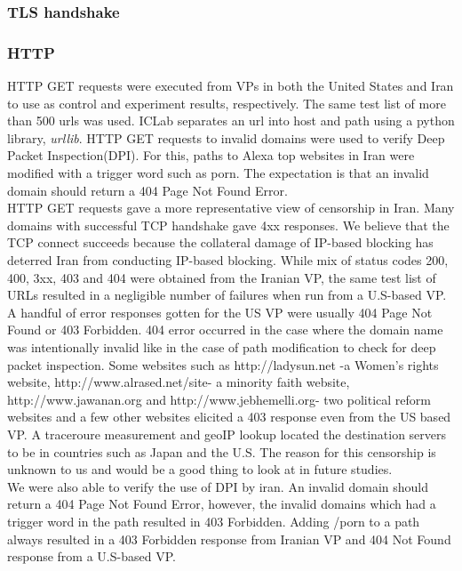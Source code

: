 \subsubsection{TLS handshake}
\subsubsection{HTTP}
 HTTP GET requests were executed from VPs  in both the United States and Iran to use as control and experiment results, respectively. The same test list of more than 500 urls was used. ICLab separates an url into host and path using a python library, \textit{urllib}. HTTP GET requests to invalid domains were used to verify Deep Packet Inspection(DPI). For this, paths to Alexa top websites in Iran were modified with a trigger word such as porn. The expectation is that an invalid domain should return a 404 Page Not Found Error.\\
HTTP GET requests gave a more representative view of censorship in Iran. Many domains with successful TCP handshake gave 4xx responses. We believe that  the TCP connect succeeds because the collateral damage of IP-based blocking has deterred Iran from conducting IP-based blocking. While mix of status codes 200, 400, 3xx, 403 and 404 were obtained from the Iranian VP, the same test list of URLs resulted in a negligible number of failures when run from a U.S-based VP.  A handful of error responses gotten for the US VP were usually  404 Page Not Found or 403 Forbidden. 404 error occurred in the case where the domain name was intentionally invalid like in the case of path modification to check for deep packet inspection. Some websites such as http://ladysun.net -a Women's rights website, http://www.alrased.net/site- a minority faith website, http://www.jawanan.org and http://www.jebhemelli.org- two political reform websites and a few other websites elicited a 403 response even from the US based VP. A traceroure measurement and geoIP lookup located the destination servers to be in countries such as  Japan and the U.S.  The reason for this censorship is unknown to us and would be a good thing to look at in future studies.\\
We were also able to verify the use of DPI by iran. An invalid domain should return a 404 Page Not Found Error, however, the invalid domains which had a trigger word in the path resulted in 403 Forbidden. Adding /porn to a path always resulted in a 403 Forbidden response from Iranian VP and 404 Not Found response from a U.S-based VP. \\ 



